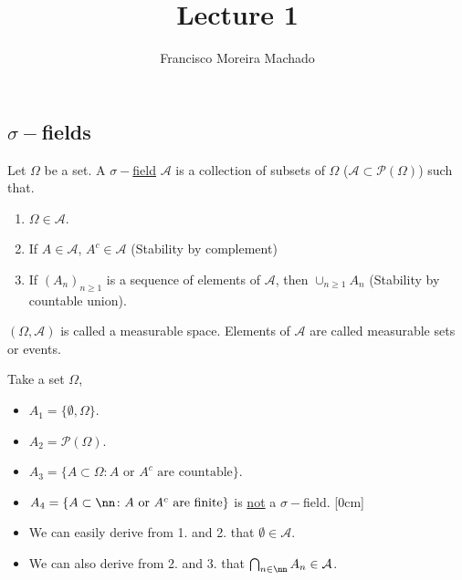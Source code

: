 \documentclass{scrartcl}
\author{Francisco Moreira Machado}
\title{Lecture 1}
\begin{document}
  \subsection{$\sigma-$fields}
  \begin{definition*}
    Let $ \Omega $ be a set. A \underline{$\sigma-$field} $\mathcal{A}$ is a collection of
    subsets of $\Omega$ ($\mathcal{A}\subset\mathcal{P}(\Omega)$) such that.
    \begin{enumerate}
    \item $\Omega \in \mathcal{A}$.
    \item If $A \in \mathcal{A}$, $A^c \in \mathcal{A}$ (Stability by complement)
    \item If $(A_n)_{n \geq 1}$ is a sequence of elements of $\mathcal{A}$, then $\cup_{n \geq
      1} A_n $ (Stability by countable union).
    \end{enumerate}
  \end{definition*}

  $(\Omega, \mathcal{A})$ is called a measurable space. Elements of $\mathcal{A}$ are called
  measurable sets or events.

  \begin{example}
      Take a set $\Omega$,
      \begin{itemize}
        \item $A_1 = \{ \emptyset, \Omega \} $.
        \item $A_2 = \mathcal{P}(\Omega) $.
        \item $A_3 = \{ A \subset \Omega \colon A \text{ or } A^c \text{ are countable} \} $.
        \item $A_4 = \{ A \subset \nn \colon  A \text{ or } A^c \text{ are finite} \} $ is
          \underline{not} a $\sigma-$field.
        [0cm]
      \end{itemize}
  \end{example}

  \begin{remark}
    \begin{itemize}
      \item We can easily derive from 1. and 2. that $\emptyset \in \mathcal{A}$.
      \item We can also derive from 2. and 3. that $\bigcap_{n \in \nn} A_n \in \mathcal{A}$.
    \end{itemize}
  \end{remark}
\end{document}
